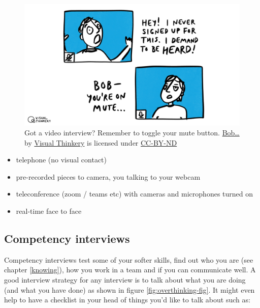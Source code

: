\documentclass[
]{book}
\providecommand{\tightlist}{%
  \setlength{\itemsep}{0pt}\setlength{\parskip}{0pt}}
\begin{document}
\begin{figure}

{\centering \includegraphics[width=1\linewidth]{images/bob-youre-on-mute} 

}

\caption{Got a video interview? Remember to toggle your mute button. \href{https://bryanmmathers.com/bob/}{Bob\ldots{}} by \href{https://visualthinkery.com/}{Visual Thinkery} is licensed under \href{https://creativecommons.org/licenses/by-nd/4.0/}{CC-BY-ND}}\label{fig:bobonmute-fig}
\end{figure}



\begin{itemize}
\tightlist
\item
  telephone (no visual contact)
\item
  pre-recorded pieces to camera, you talking to your webcam
\item
  teleconference (zoom / teams etc) with cameras and microphones turned on
\item
  real-time face to face
\end{itemize}

\hypertarget{hrinterview}{%
\subsection{Competency interviews}\label{hrinterview}}

Competency interviews test some of your softer skills, find out who you are (see chapter \ref{knowing}), how you work in a team and if you can communicate well. A good interview strategy for any interview is to talk about what you are doing (and what you have done) as shown in figure \ref{fig:overthinking-fig}. It might even help to have a checklist in your head of things you'd like to talk about such as:
\end{document}
